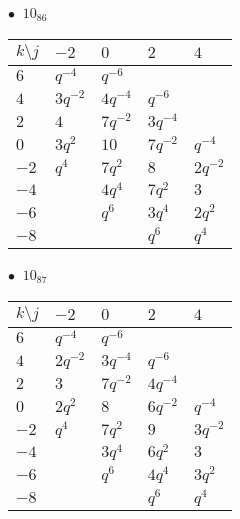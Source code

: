 \begin{minipage}{\linewidth}
$\bullet\ $ $10_{86}$ \vspace{0.5em} \\
\begin{tabular}{l|llll}
$k \setminus j$ & $-2$ & $0$ & $2$ & $4$ \\
\hline
$6$ & $q^{-4}$ & $q^{-6}$ &  &  \\
$4$ & $3q^{-2}$ & $4q^{-4}$ & $q^{-6}$ &  \\
$2$ & $4$ & $7q^{-2}$ & $3q^{-4}$ &  \\
$0$ & $3q^{2}$ & $10$ & $7q^{-2}$ & $q^{-4}$ \\
$-2$ & $q^{4}$ & $7q^{2}$ & $8$ & $2q^{-2}$ \\
$-4$ &  & $4q^{4}$ & $7q^{2}$ & $3$ \\
$-6$ &  & $q^{6}$ & $3q^{4}$ & $2q^{2}$ \\
$-8$ &  &  & $q^{6}$ & $q^{4}$ \\
\end{tabular}
\vspace{2em}
\end{minipage}
%
\begin{minipage}{\linewidth}
$\bullet\ $ $10_{87}$ \vspace{0.5em} \\
\begin{tabular}{l|llll}
$k \setminus j$ & $-2$ & $0$ & $2$ & $4$ \\
\hline
$6$ & $q^{-4}$ & $q^{-6}$ &  &  \\
$4$ & $2q^{-2}$ & $3q^{-4}$ & $q^{-6}$ &  \\
$2$ & $3$ & $7q^{-2}$ & $4q^{-4}$ &  \\
$0$ & $2q^{2}$ & $8$ & $6q^{-2}$ & $q^{-4}$ \\
$-2$ & $q^{4}$ & $7q^{2}$ & $9$ & $3q^{-2}$ \\
$-4$ &  & $3q^{4}$ & $6q^{2}$ & $3$ \\
$-6$ &  & $q^{6}$ & $4q^{4}$ & $3q^{2}$ \\
$-8$ &  &  & $q^{6}$ & $q^{4}$ \\
\end{tabular}
\vspace{2em}
\end{minipage}
%
